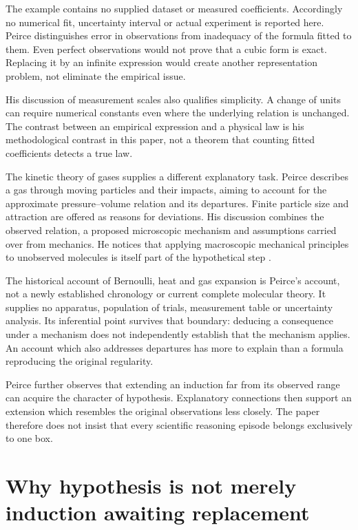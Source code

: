 The example contains no supplied dataset or measured coefficients.
Accordingly no numerical fit, uncertainty interval or actual experiment
is reported here. Peirce distinguishes error in observations from
inadequacy of the formula fitted to them. Even perfect observations
would not prove that a cubic form is exact. Replacing it by an infinite
expression would create another representation problem, not eliminate
the empirical issue.

His discussion of measurement scales also qualifies simplicity. A change
of units can require numerical constants even where the underlying relation
is unchanged. The contrast between an empirical expression and a physical
law is his methodological contrast in this paper, not a theorem that
counting fitted coefficients detects a true law.

The kinetic theory of gases supplies a different explanatory task.
Peirce describes a gas through moving particles and their impacts, aiming
to account for the approximate pressure--volume relation and its departures.
Finite particle size and attraction are offered as reasons for deviations.
His discussion combines the observed relation, a proposed microscopic
mechanism and assumptions carried over from mechanics. He notices that
applying macroscopic mechanical principles to unobserved molecules is
itself part of the hypothetical step
\parencite[sec.~IV]{Peirce1878DIHPrimary}.

The historical account of Bernoulli, heat and gas expansion is Peirce's
account, not a newly established chronology or current complete molecular
theory. It supplies no apparatus, population of trials, measurement table
or uncertainty analysis. Its inferential point survives that boundary:
deducing a consequence under a mechanism does not independently establish
that the mechanism applies. An account which also addresses departures
has more to explain than a formula reproducing the original regularity.

Peirce further observes that extending an induction far from its observed
range can acquire the character of hypothesis. Explanatory connections
then support an extension which resembles the original observations less
closely. The paper therefore does not insist that every scientific
reasoning episode belongs exclusively to one box.

\section{Why hypothesis is not merely induction awaiting replacement}
\label{sec:p16-peirce-1878-limits}

